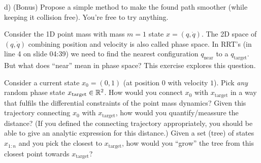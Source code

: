 d) (Bonus) Propose a simple method to make the found path smoother (while keeping it
collision free). You're free to try anything.




Consider the 1D point mass with mass $m=1$ state $x=(q, \dot q)$. The
2D space of $(q,\dot q)$ combining position and velocity is also
called phase space. In RRT's (in line 4 on slide 04:39) we need to
find the nearest configuration $q_\text{near}$ to a
$q_\text{target}$. But what does ``near'' mean in phase space? This
exercise explores this question.


Consider a current state $x_0=(0,1)$ (at position $0$ with velocity
$1$). Pick \emph{any} random phase state $x_\text{target} \in
{\mathbb{R}}^2$. How would you connect $x_0$ with $x_\text{target}$ in a way
that fulfils the differential constraints of the point mass dynamics?
Given this trajectory connecting $x_0$ with $x_\text{target}$, how
would you quantify/meassure the distance? (If you defined the
connecting trajectory appropriately, you should be able to give an
analytic expression for this distance.) Given a set (tree) of states
$x_{1:n}$ and you pick the closest to $x_\text{target}$, how would you
``grow'' the tree from this closest point towards $x_\text{target}$?

\exerfoot
